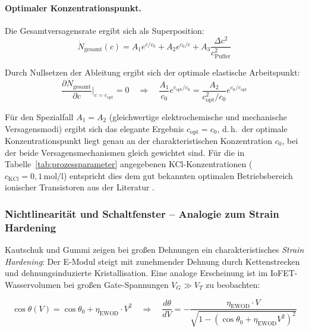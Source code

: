 ﻿\documentclass[a4paper,12pt]{scrreprt}
\theoremstyle{definition}
\begin{document}
\paragraph{Optimaler Konzentrationspunkt.}
Die Gesamtversagensrate ergibt sich als Superposition:
\begin{equation}
	\dot{N}_{\mathrm{gesamt}}(c) = A_1 e^{c/c_0} + A_2 e^{c_0/c} + A_3 \frac{\Delta c^2}{c_{\mathrm{Puffer}}^2}
	\label{eq:gesamt_versagen}
\end{equation}

Durch Nullsetzen der Ableitung ergibt sich der optimale elastische
Arbeitspunkt:
\begin{equation}
	\frac{\partial \dot{N}_{\mathrm{gesamt}}}{\partial c}\bigg|_{c = c_{\mathrm{opt}}} = 0
	\quad \Rightarrow \quad
	\frac{A_1}{c_0} e^{c_{\mathrm{opt}}/c_0} = \frac{A_2}{c_{\mathrm{opt}}^2 / c_0} e^{c_0/c_{\mathrm{opt}}}
	\label{eq:arbeitspunkt}
\end{equation}

Für den Spezialfall $A_1 = A_2$ (gleichwertige elektrochemische und mechanische
Versagensmodi) ergibt sich das elegante Ergebnis $c_{\mathrm{opt}} = c_0$,
d.\,h.\ der optimale Konzentrationspunkt liegt genau an der charakteristischen
Konzentration $c_0$, bei der beide Versagensmechanismen gleich gewichtet sind.
Für die in Tabelle~\ref{tab:prozessparameter} angegebenen KCl-Konzentrationen
($c_{\mathrm{KCl}} = 0{,}1\,\mathrm{mol/l}$) entspricht dies dem gut bekannten
optimalen Betriebsbereich ionischer Transistoren aus der Literatur
\cite{xu2021, maas2020}.

\subsubsection{Nichtlinearität und Schaltfenster -- Analogie zum Strain Hardening}

Kautschuk und Gummi zeigen bei großen Dehnungen ein charakteristisches
\emph{Strain Hardening}: Der E-Modul steigt mit zunehmender Dehnung
durch Kettenstrecken und dehnungsinduzierte Kristallisation. Eine analoge
Erscheinung ist im IoFET-Wasservolumen bei großen Gate-Spannungen
$V_G \gg V_T$ zu beobachten:

\begin{equation}
	\cos\theta(V) = \cos\theta_0 + \eta_{\mathrm{EWOD}} \cdot V^2
	\quad \Rightarrow \quad
	\frac{d\theta}{dV} = -\frac{\eta_{\mathrm{EWOD}} \cdot V}{\sqrt{1 - (\cos\theta_0 + \eta_{\mathrm{EWOD}} V^2)^2}}
	\label{eq:ewod_nichtlinear}
\end{equation}
\end{document}

